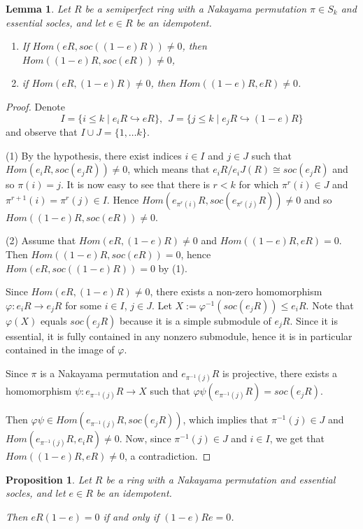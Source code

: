 \documentclass{article}
\theoremstyle{plain}
\newtheorem{Prop}[veta]{Proposition}
\newtheorem{Lemma}[veta]{Lemma}
\theoremstyle{plain}
\theoremstyle{remark}
\theoremstyle{plain}
\begin{document}
\begin{Lemma}\label{LemmaHom} Let $R$ be a semiperfect ring with a Nakayama permutation $\pi\in S_k$ and essential socles, and let $e\in R$ be an idempotent. 
\begin{enumerate}
\item[(1)] If $Hom(eR,soc((1-e)R))\ne 0$, then $Hom((1-e)R,soc(eR))\ne 0$,
\item[(2)] if $Hom(eR,(1-e)R)\ne 0$, then $Hom((1-e)R,eR)\ne 0$.
 \end{enumerate} 
\end{Lemma}
\begin{proof} 
Denote
\[
I=\{i\le k\mid e_iR\hookrightarrow eR\},\ \ J=\{j\le k\mid e_jR\hookrightarrow (1-e)R\}
\]
and observe that $I\cup J=\{1,\dots k\}$. 

(1) By the hypothesis, there exist indices $i\in I$ and $j\in J$ such that $Hom(e_iR,soc(e_jR))\ne 0$, which means that $e_iR/e_iJ(R)\cong soc(e_jR)$ and so $\pi(i)=j$. It is now easy to see that there is $r< k$ for which $\pi^r(i)\in J$ and $\pi^{r+1}(i)=\pi^r(j)\in I$. Hence $Hom(e_{\pi^r(i)}R,soc(e_{\pi^r(j)}R))\ne 0$ and so $Hom((1-e)R,soc(eR))\ne 0$.

(2) Assume that $Hom(eR,(1-e)R)\ne 0$ and $Hom((1-e)R,eR)= 0$. Then $Hom((1-e)R,soc(eR))= 0$, hence $Hom(eR,soc((1-e)R))=0$ by (1).

Since $Hom(eR,(1-e)R)\ne 0$, there exists a non-zero homomorphism $\varphi\colon e_iR \to e_jR$ for some $i\in I$, $j\in J$. Let $X:=\varphi^{-1}(soc(e_jR))\le e_iR$.  Note that $\varphi(X)$ equals $soc(e_jR)$ because it is a simple submodule of $e_jR$. Since it is essential, it is fully contained in any nonzero submodule, hence it is in particular contained in the image of $\varphi$.

Since $\pi$ is a Nakayama permutation and $e_{\pi^{-1}(j)}R$ is projective, there exists a homomorphism 
$\psi\colon e_{\pi^{-1}(j)}R\to X$ such that $\varphi\psi(e_{\pi^{-1}(j)}R)=soc(e_jR)$. 

Then $\varphi\psi\in Hom(e_{\pi^{-1}(j)}R,soc(e_jR))$, which implies that $\pi^{-1}(j)\in J$ and $Hom(e_{\pi^{-1}(j)}R, e_iR)\ne 0$. Now, since $\pi^{-1}(j)\in J$ and $i\in I$, we get that $Hom((1-e)R,eR)\ne 0$, a contradiction.
\end{proof}
\begin{Prop}\label{Propcentral}
    Let $R$ be a ring with a Nakayama permutation and essential socles, and let $e\in R$ be an idempotent.

    Then $eR(1-e)=0$ if and only if $(1-e)Re=0$.
\end{Prop}
\end{document}
